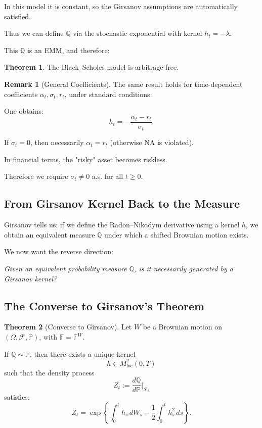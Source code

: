 \documentclass[12pt,a4paper]{article}
\theoremstyle{definition}
\newtheorem{theorem}{Theorem}[section]
\newtheorem{remark}{Remark}[section]
\begin{document}
In this model it is constant, so the Girsanov assumptions are automatically satisfied.

Thus we can define $\mathbb{Q}$ via the stochastic exponential with kernel $h_t = -\lambda$.

This $\mathbb{Q}$ is an EMM, and therefore:

\begin{theorem}
The Black--Scholes model is arbitrage-free.
\end{theorem}

\begin{remark}[General Coefficients]
The same result holds for time-dependent coefficients $\alpha_t, \sigma_t, r_t$, under standard conditions.

One obtains:
\[
h_t = -\frac{\alpha_t - r_t}{\sigma_t}.
\]

If $\sigma_t = 0$, then necessarily $\alpha_t = r_t$ (otherwise NA is violated).

In financial terms, the "risky" asset becomes riskless.

Therefore we require $\sigma_t \neq 0$ a.s. for all $t \geq 0$.
\end{remark}

\subsection{From Girsanov Kernel Back to the Measure}

Girsanov tells us: if we define the Radon--Nikodym derivative using a kernel $h$, we obtain an equivalent measure $\mathbb{Q}$ under which a shifted Brownian motion exists.

We now want the reverse direction:

\textit{Given an equivalent probability measure $\mathbb{Q}$, is it necessarily generated by a Girsanov kernel?}

\subsection{The Converse to Girsanov's Theorem}

\begin{theorem}[Converse to Girsanov]
Let $W$ be a Brownian motion on $(\Omega, \mathcal{F}, \mathbb{P})$, with $\mathbb{F} = \mathbb{F}^W$.

If $\mathbb{Q} \sim \mathbb{P}$, then there exists a unique kernel
\[
h \in M_{\text{loc}}^2(0, T)
\]
such that the density process
\[
Z_t := \frac{d\mathbb{Q}}{d\mathbb{P}}\Big|_{\mathcal{F}_t}
\]
satisfies:
\[
Z_t = \exp\left\{\int_0^t h_s \, dW_s - \frac{1}{2} \int_0^t h_s^2 \, ds\right\}.
\]
\end{theorem}
\end{document}
